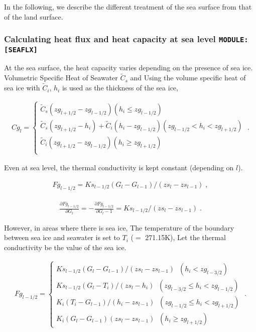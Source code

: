 In the following, we describe the different treatment of the sea surface
from that of the land surface.

\hypertarget{calculating-heat-flux-and-heat-capacity-at-sea-level-moduleseaflx}{%
\subsubsection{\texorpdfstring{Calculating heat flux and heat capacity
at sea level
\texttt{MODULE:{[}SEAFLX{]}}}{Calculating heat flux and heat capacity at sea level MODULE:{[}SEAFLX{]}}}\label{calculating-heat-flux-and-heat-capacity-at-sea-level-moduleseaflx}}

At the sea surface, the heat capacity varies depending on the presence
of sea ice. Volumetric Specific Heat of Seawater \(\tilde{C}_s\) and
Using the volume specific heat of sea ice with \(\tilde{C}_i\), \(h_i\)
is used as the thickness of the sea ice,

\begin{eqnarray}
  Cg_{l}  = \left\{ 
    \begin{array}{ll}
      \tilde{C}_s (zg_{l+1/2} - zg_{l-1/2})
               ( h_i \le zg_{l-1/2} )\\
      \tilde{C}_s (zg_{l+1/2} - h_i)
    + \tilde{C}_i ( h_i - zg_{l-1/2} )
               ( zg_{l-1/2} < h_i < zg_{l+1/2} )\\
      \tilde{C}_i (zg_{l+1/2} - zg_{l-1/2})
               ( h_i \ge zg_{l+1/2} ) \\
    \end{array} 
    \right. \; .
\end{eqnarray}

Even at sea level, the thermal conductivity is kept constant (depending
on \(l\)).

\begin{eqnarray}
  Fg_{l-1/2} = Ks_{l-1/2} (G_l - G_{l-1})/(zs_l - zs_{l-1}) \; ,
\end{eqnarray}

\begin{eqnarray}
  \frac{\partial Fg_{l-1/2}}{\partial G_l} = - \frac{\partial Fg_{l-1/2}}{\partial G_l-1} 
 = Ks_{l-1/2}/(zs_l - zs_{l-1}) \; .
\end{eqnarray}

However, in areas where there is sea ice, The temperature of the
boundary between sea ice and seawater is set to \(T_i\) (\(=\) 271.15K),
Let the thermal conductivity be the value of the sea ice.

\begin{eqnarray}
  Fg_{l-1/2}  = \left\{ 
    \begin{array}{ll}
      Ks_{l-1/2} (G_l - G_{l-1})/(zs_l - zs_{l-1}) \;\; 
               (h_i < zg_{l-3/2} ) \\
      Ks_{l-1/2} (G_l - T_i)/(zs_l - h_i) \;\; 
               ( zg_{l-3/2} \le h_i < zg_{l-1/2} )\\
      K_i (T_i - G_{l-1})/(h_i - zs_{l-1}) \;\; 
               ( zg_{l-1/2} \le h_i < zg_{l+1/2} )\\
      K_i (G_l - G_{l-1})(zs_l - zs_{l-1}) \;\; 
               (h_i \ge zg_{l+1/2} )
    \end{array} 
    \right. \; .
\end{eqnarray}

